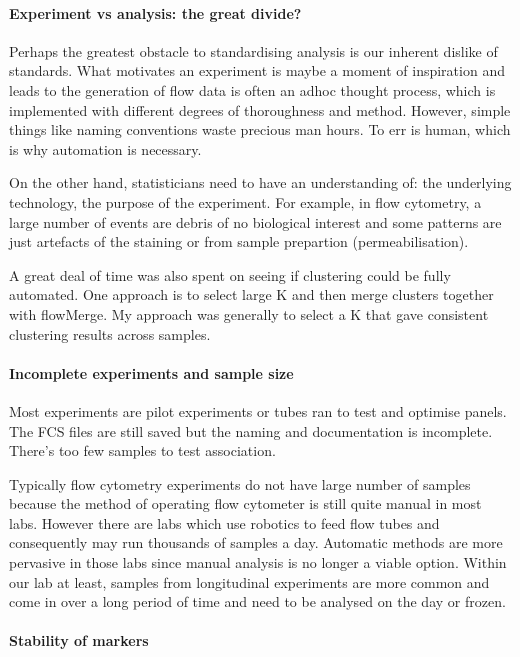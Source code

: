 \paragraph{Experiment vs analysis: the great divide?}

Perhaps the greatest obstacle to standardising analysis is our inherent dislike of standards.
What motivates an experiment is maybe a moment of inspiration and leads to the generation of flow data is often an adhoc thought process,
which is implemented with different degrees of thoroughness and method.
However, simple things like naming conventions waste precious man hours.
To err is human,  which is why automation is necessary.

On the other hand, statisticians need to have an understanding of: the underlying technology, the purpose of the experiment.
For example, in flow cytometry, a large number of events are debris of no biological interest and some patterns are just artefacts of the staining or from sample prepartion (permeabilisation).

A great deal of time was also spent on seeing if clustering could be fully automated. 
One approach is to select large K and then merge clusters together with flowMerge.
My approach was generally to select a K that gave consistent clustering results across samples.



\paragraph{ Incomplete experiments and sample size}

Most experiments are pilot experiments or tubes ran to test and optimise panels.
The FCS files are still saved but the naming and documentation is incomplete.
There’s too few samples to test association.

Typically flow cytometry experiments do not have large number of samples because the method of operating flow cytometer is still quite manual in most labs.
However there are labs which use robotics to feed flow tubes and consequently may run thousands of samples a day.
Automatic methods are more pervasive in those labs since manual analysis is no longer a viable option.
Within our lab at least, samples from longitudinal experiments are more common and come in over a long period of time and need to be analysed on the day or frozen.



\paragraph{ Stability of markers }

